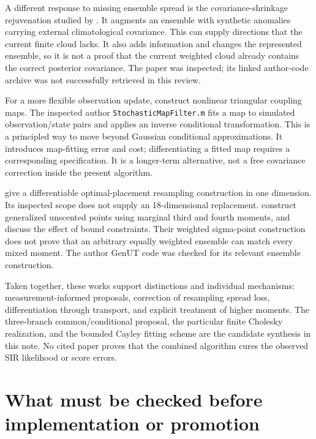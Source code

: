 A different response to missing ensemble spread is the covariance-shrinkage
rejuvenation studied by \citet[Sections 4--6]{popov2022rejuvenation}. It augments an
ensemble with synthetic anomalies carrying external climatological covariance.
This can supply directions that the current finite cloud lacks. It also adds
information and changes the represented ensemble, so it is not a proof that
the current weighted cloud already contains the correct posterior covariance.
The paper was inspected; its linked author-code archive was not successfully
retrieved in this review.

For a more flexible observation update, \citet[Sections 3.3, 3.7 and
Appendix A]{spantini2022coupling} construct nonlinear triangular coupling maps.
The inspected author \texttt{StochasticMapFilter.m} fits a map to simulated
observation/state pairs and applies an inverse conditional transformation.
This is a principled way to move beyond Gaussian conditional approximations.
It introduces map-fitting error and cost; differentiating a fitted map
requires a corresponding specification. It is a longer-term alternative,
not a free covariance correction inside the present algorithm.

\citet[Sections III--V]{csuzdi2024optimalplacement} give a differentiable
optimal-placement resampling construction in one dimension.
Its inspected scope does not supply an 18-dimensional replacement.
\citet[Sections IV--V]{ebeigbe2025genut} construct generalized unscented points
using marginal third and fourth moments, and discuss the effect of bound
constraints. Their weighted sigma-point construction does not prove that
an arbitrary equally weighted ensemble can match every mixed moment.
The author GenUT code was checked for its relevant ensemble construction.

Taken together, these works support distinctions and individual mechanisms:
measurement-informed proposals, correction of resampling spread loss,
differentiation through transport, and explicit treatment of higher moments.
The three-branch common/conditional proposal, the particular finite
Cholesky realization, and the bounded Cayley fitting scheme are the
candidate synthesis in this note. No cited paper proves that the combined
algorithm cures the observed SIR likelihood or score errors.

\section[Checks before implementation]{What must be checked before implementation or promotion}

